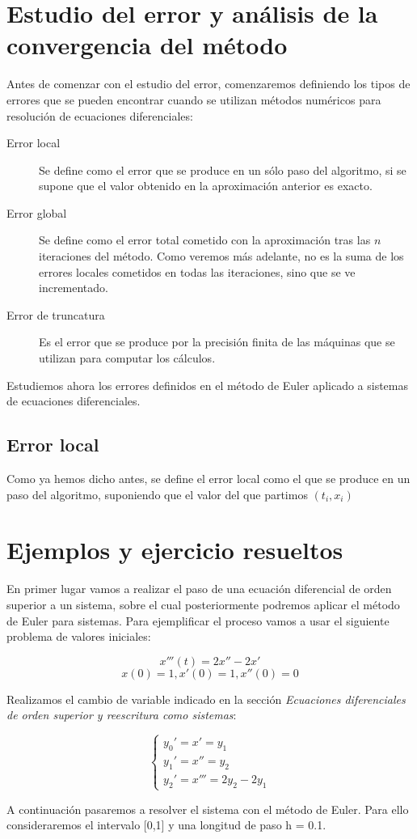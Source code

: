 \documentclass[12pt]{article}       %
\begin{document}
\section{Estudio del error y análisis de la convergencia del método}

Antes de comenzar con el estudio del error, comenzaremos definiendo los tipos de errores que se pueden encontrar cuando se utilizan métodos numéricos para resolución de ecuaciones diferenciales:

\begin{description}
\item[Error local] Se define como el error que se produce en un sólo paso del algoritmo, si se supone que el valor obtenido en la aproximación anterior es exacto.
\item[Error global] Se define como el error total cometido con la aproximación tras las $n$ iteraciones del método. Como veremos más adelante, no es la suma de los errores locales cometidos en todas las iteraciones, sino que se ve incrementado.
\item[Error de truncatura] Es el error que se produce por la precisión finita de las máquinas que se utilizan para computar los cálculos.
\end{description}

Estudiemos ahora los errores definidos en el método de Euler aplicado a sistemas de ecuaciones diferenciales.

\subsection{Error local}

Como ya hemos dicho antes, se define el error local como el que se produce en un paso del algoritmo, suponiendo que el valor del que partimos $(t_i, x_i)$

\section{Ejemplos y ejercicio resueltos}

En primer lugar vamos a realizar el paso de una ecuación diferencial de orden superior a un sistema, sobre el cual posteriormente podremos aplicar el método de Euler para sistemas. Para ejemplificar el proceso vamos a usar el siguiente problema de valores iniciales: 

$$
x'''(t) = 2x'' - 2x'     %
$$
$$
x(0)=1, x'(0)=1, x''(0)=0
$$

Realizamos el cambio de variable indicado en la sección \textit{Ecuaciones diferenciales de orden superior y reescritura como sistemas}:

$$
\begin{cases}
y_0' = x' = y_1\\
y_1' = x'' = y_2\\
y_2' = x''' = 2y_2 - 2y_1
\end{cases}
$$

A continuación pasaremos a resolver el sistema con el método de Euler. Para ello consideraremos el intervalo [0,1] y una longitud de paso h = 0.1.
\end{document}
